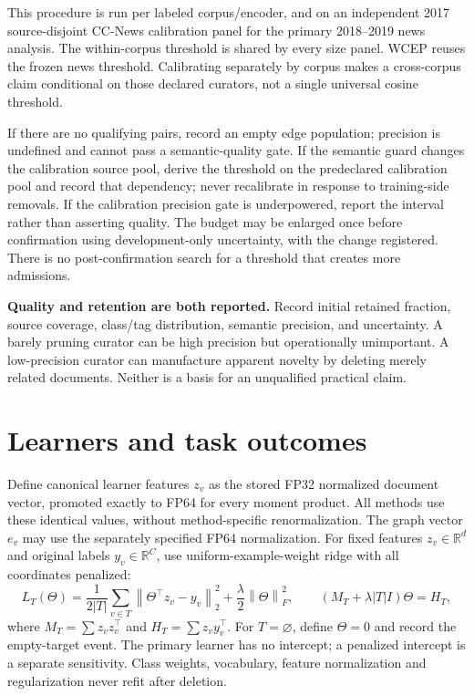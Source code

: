 \documentclass[11pt,a4paper]{article}
\newcommand{\R}{\mathbb R}\newcommand{\E}{\mathbb E}
\newcommand{\norm}[1]{\left\lVert #1\right\rVert}
\begin{document}
This procedure is run per labeled corpus/encoder, and on an independent 2017 source-disjoint CC-News calibration panel for the primary 2018--2019 news analysis. The within-corpus threshold is shared by every size panel. WCEP reuses the frozen news threshold. Calibrating separately by corpus makes a cross-corpus claim conditional on those declared curators, not a single universal cosine threshold.

If there are no qualifying pairs, record an empty edge population; precision is undefined and cannot pass a semantic-quality gate. If the semantic guard changes the calibration source pool, derive the threshold on the predeclared calibration pool and record that dependency; never recalibrate in response to training-side removals. If the calibration precision gate is underpowered, report the interval rather than asserting quality. The budget may be enlarged once before confirmation using development-only uncertainty, with the change registered. There is no post-confirmation search for a threshold that creates more admissions.

\textbf{Quality and retention are both reported.} Record initial retained fraction, source coverage, class/tag distribution, semantic precision, and uncertainty. A barely pruning curator can be high precision but operationally unimportant. A low-precision curator can manufacture apparent novelty by deleting merely related documents. Neither is a basis for an unqualified practical claim.

\section{Learners and task outcomes}
Define canonical learner features $z_v$ as the stored FP32 normalized document vector, promoted exactly to FP64 for every moment product. All methods use these identical values, without method-specific renormalization. The graph vector $e_v$ may use the separately specified FP64 normalization. For fixed features $z_v\in\R^d$ and original labels $y_v\in\R^C$, use uniform-example-weight ridge with all coordinates penalized:
\[
 L_T(\Theta)=\frac{1}{2|T|}\sum_{v\in T}\norm{\Theta^\top z_v-y_v}_2^2+
 \frac{\lambda}{2}\norm{\Theta}_F^2,
 \qquad (M_T+\lambda |T|I)\Theta=H_T,
\]
where $M_T=\sum z_vz_v^\top$ and $H_T=\sum z_vy_v^\top$. For $T=\varnothing$, define $\Theta=0$ and record the empty-target event. The primary learner has no intercept; a penalized intercept is a separate sensitivity. Class weights, vocabulary, feature normalization and regularization never refit after deletion.
\end{document}
